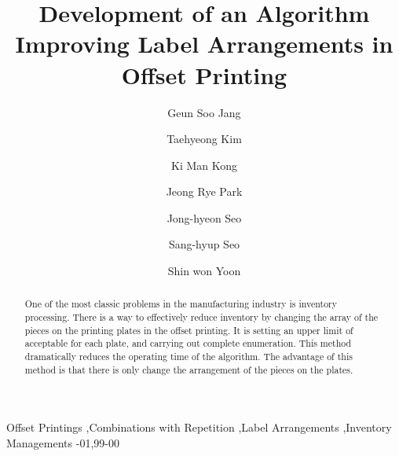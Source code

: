 \documentclass[review]{elsarticle}
\begin{document}
\begin{frontmatter}

\title{Development of an Algorithm Improving Label Arrangements in Offset Printing}



\author[PNU]{Geun Soo Jang}

\author[PNU]{Taehyeong Kim}

\author[WorldKomax]{Ki Man Kong}

\author[PNU]{Jeong Rye Park}

\author[Chubu]{Jong-hyeon Seo}

\author[PNU]{Sang-hyup Seo}

\author[PNU]{Shin won Yoon}

\address[PNU]{Finance.Fishery.Manufacture Industrial Mathematics Center on Big Data, Pusan National University, Busan, 46241, Republic of Korea}
\address[Chubu]{Chubu University Academy of Emerging Science, Kasugai, 487-0027, Japan}
\address[WorldKomax]{World Komax Co., Ltd., 1505, Centum Jungang-Ro 48,Haeundae-Gu, Busan, 48059, Republic of Korea}

\begin{abstract}
One of the most classic problems in the manufacturing industry is inventory processing. 
There is a way to effectively reduce inventory by 
changing the array of the pieces on the printing plates in the offset printing. 
It is setting an upper limit of acceptable for each plate, and carrying out complete enumeration. 
This method dramatically reduces the operating time of the algorithm. 
The advantage of this method is that there is only change the arrangement of the pieces on the plates.
\end{abstract}

\begin{keyword}
Offset Printings \sep Combinations with Repetition \sep Label Arrangements \sep Inventory Managements
-01\sep  99-00
\end{keyword}

\end{frontmatter}
\end{document}
